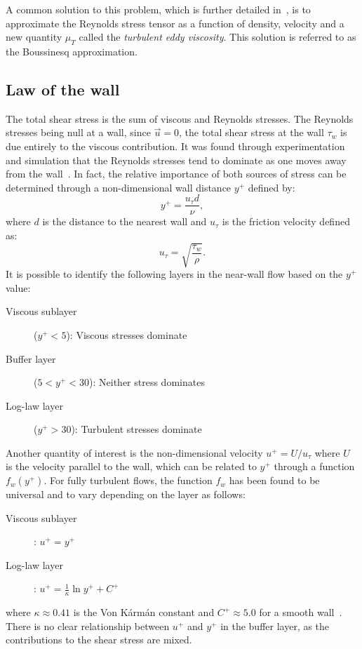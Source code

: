 A common solution to this problem, which is further detailed in~, is to approximate the Reynolds stress tensor as a function of density, velocity and a new quantity $\mu_T$ called the \emph{turbulent eddy viscosity}. This solution is referred to as the Boussinesq approximation.
%
\subsection{Law of the wall}
\label{sec:lawofthewall}
%
The total shear stress is the sum of viscous and Reynolds stresses. The Reynolds stresses being null at a wall, since $\vec{u} = 0$, the total shear stress at the wall $\tau_w$ is due entirely to the viscous contribution. It was found through experimentation and simulation that the Reynolds stresses tend to dominate as one moves away from the wall~\cite{pope2001turbulent}. In fact, the relative importance of both sources of stress can be determined through a non-dimensional wall distance $y^+$ defined by:
\begin{equation*}
    y^+ = \frac{u_\tau d}{\nu},
\end{equation*}
where $d$ is the distance to the nearest wall and $u_\tau$ is the friction velocity defined as:
\begin{equation*}
    u_\tau = \sqrt{\frac{\tau_w}\rho}.
\end{equation*}
It is possible to identify the following layers in the near-wall flow based on the $y^+$ value:
\begin{description}
    \item[Viscous sublayer] ($y^+ < 5$): Viscous stresses dominate
    \item[Buffer layer] ($5 < y^+ < 30$): Neither stress dominates
    \item[Log-law layer] ($y^+ > 30$): Turbulent stresses dominate
\end{description}
Another quantity of interest is the non-dimensional velocity $u^+ = U/u_\tau$ where $U$ is the velocity parallel to the wall, which can be related to $y^+$ through a function $f_w(y^+)$. For fully turbulent flows, the function $f_w$ has been found to be universal and to vary depending on the layer as follows:
\begin{description}
    \item[Viscous sublayer]: $u^+ = y^+$
    \item[Log-law layer]: $u^+ = \frac{1}{\kappa} \ln y^+ + C^+$
\end{description}
where $\kappa \approx 0.41 $ is the Von Kármán constant and $C^+\approx5.0$ for a smooth wall~\cite{pope2001turbulent}. There is no clear relationship between $u^+$ and $y^+$ in the buffer layer, as the contributions to the shear stress are mixed.


